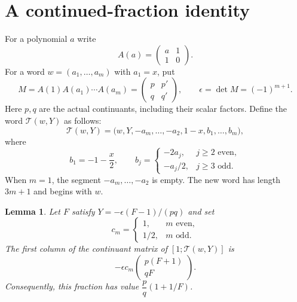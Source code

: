 \documentclass[11pt]{article}
\newtheorem{lemma}{Lemma}
\begin{document}
\section*{A continued-fraction identity}
For a polynomial $a$ write
\[
 A(a)=\begin{pmatrix}a&1\\1&0\end{pmatrix}.
\]
For a word $w=(a_1,\ldots,a_m)$ with $a_1=x$, put
\[
 M=A(1)A(a_1)\cdots A(a_m)
   =\begin{pmatrix}p&p'\\q&q'\end{pmatrix},
 \qquad \epsilon=\det M=(-1)^{m+1}.
\]
Here $p,q$ are the actual continuants, including their scalar factors.
Define the word $\mathcal T(w,Y)$ as follows:
\begin{equation}\label{word}
 \mathcal T(w,Y)=
 \bigl(w,Y,-a_m,\ldots,-a_2,1-x,b_1,\ldots,b_m\bigr),
\end{equation}
where
\[
 b_1=-1-\frac{x}{2},\qquad
 b_j=\begin{cases}-2a_j,&j\geq2\text{ even},\\
                  -a_j/2,&j\geq3\text{ odd}.
       \end{cases}
\]
When $m=1$, the segment $-a_m,\ldots,-a_2$ is empty.
The new word has length $3m+1$ and begins with $w$.

\begin{lemma}\label{identity}
Let $F$ satisfy $Y=-\epsilon(F-1)/(pq)$ and set
\[
 c_m=\begin{cases}1,&m\text{ even},\\1/2,&m\text{ odd}.
       \end{cases}
\]
The first column of the continuant matrix of
$[1;\mathcal T(w,Y)]$ is
\begin{equation}\label{column}
 -\epsilon c_m\begin{pmatrix}p(F+1)\\qF\end{pmatrix}.
\end{equation}
Consequently, this fraction has value $\dfrac pq(1+1/F)$.
\end{lemma}
\end{document}
